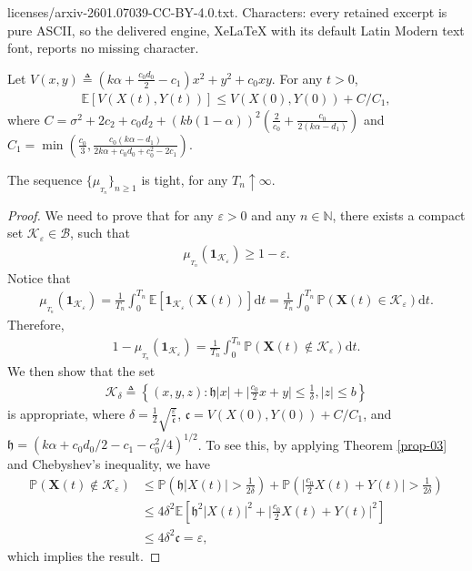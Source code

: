 \documentclass[10pt,a4paper]{amsart}
\def \E{\mathbb E}
\def \N{\mathbb N}
\def \P{\mathbb P}
\def\d{\mathrm{d}}
\newcommand{\indic}{\mathbf{1}}
\begin{document}
licenses/arxiv-2601.07039-CC-BY-4.0.txt. Characters: every retained excerpt is pure ASCII, so the delivered engine, XeLaTeX with its default Latin Modern text font, reports no missing character.
\begin{theorem}\label{prop-03} 
	Let
	$V(x,y) \triangleq  ( k \alpha + \frac{c_{0}d_{0}}{2} - c_{1} )x^2 + y^2 +  c_0 xy$. 
	For any $t>0$, 
	\begin{align*}
		\mathbb{E} [V(X(t),Y(t))] \leq V(X(0),Y(0)) +C/C_{1}, 
	\end{align*}
	where $C = \sigma^{2} + 2c_{2} + c_{0}d_{2} + (kb(1-\alpha))^{2}\left(\frac{2}{c_{0}} + \frac{c_{0}}{2(k\alpha - d_{1})}\right)$ 
	and 
	$C_{1} = \min\left(\frac{c_{0}}{3}, \frac{c_{0}(k\alpha - d_{1})}{2k\alpha +c_{0}d_{0} + c^{2}_{0} - 2c_{1}}\right)$.
\end{theorem}

\begin{lemma}\label{lemma-02}
	The sequence $\{\mu_{_{T_{n}}}\}_{n\geq 1}$ is tight, for any $T_{n}\uparrow \infty$. 
\end{lemma}

\begin{proof}
	We need to prove that for any $\varepsilon>0$ and any $n\in\N$, 
	there exists a compact set $\mathcal{K}_{\varepsilon}\in\mathcal{B}$, 
	such that
	\begin{align*}
		\mu_{_{T_{n}}}(\indic_{\mathcal{K}_{\varepsilon}})\geq 1-\varepsilon. 
	\end{align*}
	Notice that 
	\begin{align*}
		\mu_{_{T_{n}}}(\indic_{\mathcal{K}_{\varepsilon}})
		= \frac{1}{T_{n}}\int_{0}^{T_{n}}\E[\indic_{\mathcal{K}_{\varepsilon}}(\mathbf{X}(t))]\d t 
		= \frac{1}{T_{n}}\int_{0}^{T_{n}}\P (\mathbf{X}(t) \in \mathcal{K}_{\varepsilon}) \d t. 
	\end{align*}
	Therefore,
	\begin{align*}
		1 - \mu_{_{T_{n}}}(\indic_{\mathcal{K}_{\varepsilon}})
		= \frac{1}{T_{n}}\int_{0}^{T_{n}}\P (\mathbf{X}(t) \notin \mathcal{K}_{\varepsilon}) \d t. 
	\end{align*}
	We then show that the set 
	\begin{align*}
		\mathcal{K}_{\delta} \triangleq 
		\left\{ (x,y,z) : \mathfrak{h} |x| + \Big|\frac{c_{0}}{2}x + y\Big| \leq \frac{1}{\delta}, |z| \leq b\right\} 
	\end{align*}
	is appropriate, where $\delta = \frac{1}{2}\sqrt{\frac{\varepsilon}{ \mathfrak{c}}}$, 
	$ \mathfrak{c} = V(X(0), Y(0)) + C/C_{1}$, and 
	$\mathfrak{h} = \left( k\alpha + c_{0}d_{0}/2 - c_{1} - c_{0}^{2}/4\right)^{1/2}$. 
	To see this, by applying Theorem \ref{prop-03} and Chebyshev's inequality, we have
	\begin{align*}
		\P (\mathbf{X}(t) \notin \mathcal{K}_{\varepsilon}) 
		& \leq 
		\P\left(\mathfrak{h} |X(t)| > \frac{1}{2\delta}\right) + \P\left(\Big|\frac{c_{0}}{2}X(t) + Y(t)\Big| > \frac{1}{2\delta}\right)\\
		& \leq 4\delta^{2}\E\left[\mathfrak{h}^{2} |X(t)|^{2} +  \Big|\frac{c_{0}}{2}X(t) + Y(t)\Big|^{2}\right]\\
		& \leq 4\delta^{2} \mathfrak{c} = \varepsilon,
	\end{align*}
	which implies the result. 
\end{proof}
\end{document}
